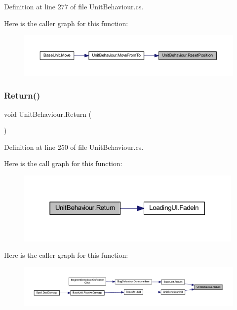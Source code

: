 Definition at line 277 of file Unit\+Behaviour.\+cs.

Here is the caller graph for this function\+:
\nopagebreak
\begin{figure}[H]
\begin{center}
\leavevmode
\includegraphics[width=350pt]{class_unit_behaviour_a19e4ade6b8de90c269e3ed840d0c9f84_icgraph}
\end{center}
\end{figure}
\mbox{\label{class_unit_behaviour_a4b2664ef7a33e795220d587cb789d169}} 
\subsubsection{\texorpdfstring{Return()}{Return()}}
{\footnotesize\ttfamily void Unit\+Behaviour.\+Return (\begin{DoxyParamCaption}{ }\end{DoxyParamCaption})}



Definition at line 250 of file Unit\+Behaviour.\+cs.

Here is the call graph for this function\+:
\nopagebreak
\begin{figure}[H]
\begin{center}
\leavevmode
\includegraphics[width=315pt]{class_unit_behaviour_a4b2664ef7a33e795220d587cb789d169_cgraph}
\end{center}
\end{figure}
Here is the caller graph for this function\+:
\nopagebreak
\begin{figure}[H]
\begin{center}
\leavevmode
\includegraphics[width=350pt]{class_unit_behaviour_a4b2664ef7a33e795220d587cb789d169_icgraph}
\end{center}
\end{figure}
\mbox{\label{class_unit_behaviour_aa4e86ce34131fe81ecef7a56855f8d94}} 
